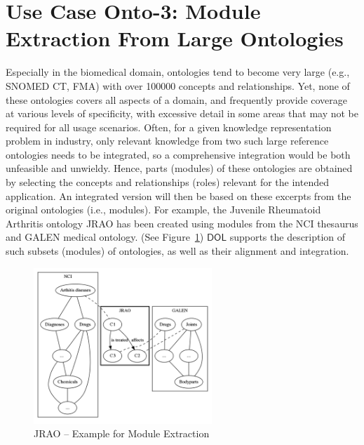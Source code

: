 \documentclass[10pt,fleqn,final]{scrreprt}
\newcommand*{\DOL}{\ensuremath{\mathsf{DOL}}\xspace}
\newcommand{\figurerefname}{Figure}
\newcommand{\fref}[1]{\figurerefname~\ref{#1}}
\newenvironment{definitions}[0]{\medskip }{}
\begin{document}
\begin{definitions}
\section{Use Case Onto-3: Module Extraction From Large Ontologies}\label{onto-3}
Especially in the biomedical domain, ontologies tend to become very large (e.g., SNOMED CT, FMA) 
with over 100000 concepts and relationships. Yet, none of these ontologies covers all aspects of a 
domain, and frequently provide coverage at various levels of specificity, with excessive detail in 
some areas that may not be required for all usage scenarios. Often, for a given knowledge 
representation problem in industry, only relevant knowledge from two such large reference 
ontologies needs to be integrated, so a comprehensive integration would be both unfeasible and 
unwieldy. Hence, parts (modules) of these ontologies are obtained by selecting the concepts and 
relationships (roles) relevant for the intended application. An integrated version will then be 
based on these excerpts from the original ontologies (i.e., modules). For example, the Juvenile 
Rheumatoid Arthritis ontology JRAO has been created using modules from the NCI thesaurus and GALEN 
medical ontology. (See \fref{JRAO}) \DOL  
supports the description of such subsets (modules) of ontologies, as well as their alignment and 
integration.


\begin{figure}[htbp]
\begin{center}
\includegraphics[width=0.6\textwidth]{useCaseOnto3.png}
\caption{JRAO  -- Example for Module Extraction}
\label{JRAO}
\end{center}
\end{figure}



\end{definitions}
\end{document}
